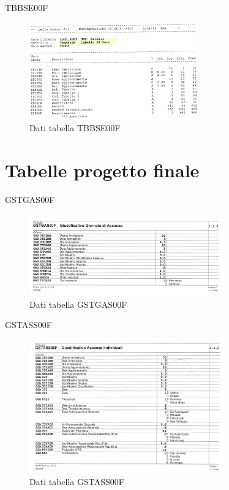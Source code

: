 \documentclass[target=bach,aauheader=,style=]{thud}
\begin{document}
TBBSE00F
\begin{figure}[H]
    \begin{center}
        \includegraphics[width=0.65\textwidth]{database/tbbse00f.jpg}
    \end{center}
    \caption{Dati tabella TBBSE00F}
\end{figure}


\newpage
\section{Tabelle progetto finale}
GSTGAS00F
\begin{figure}[H]
    \begin{center}
        \includegraphics[width=0.75\textwidth]{database/gstgas00f.jpg}
    \end{center}
    \caption{Dati tabella GSTGAS00F}
\end{figure}

GSTASS00F
\begin{figure}[H]
    \begin{center}
        \includegraphics[width=0.75\textwidth]{database/gstass00f.jpg}
    \end{center}
    \caption{Dati tabella GSTASS00F}
\end{figure}
\end{document}
